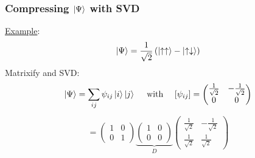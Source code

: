 \documentclass{beamer}
\theoremstyle{definition}
\newcommand{\lp}{\left(}
\newcommand{\rp}{\right)}
\newcommand{\f}[2]{\frac{#1}{#2}}
\begin{document}
\begin{frame}
	\frametitle{Compressing $\ket{\Psi}$ with SVD}
	
	\underline{Example}:  
	\begin{align*}
		\ket{\Psi} = \f{1}{\sqrt{2}}\lp \ket{\uparrow\uparrow} - \ket{\uparrow\downarrow} \rp
	\end{align*}
	\pause 
	Matrixify and SVD:
	\begin{align*}
	\ket{\Psi} = \sum_{ij}\psi_{ij}\ket{i}\ket{j} \quad \text{ with } \quad   [\psi_{ij}] = \begin{pmatrix}
			\f{1}{\sqrt{2}} & -\f{1}{\sqrt{2}} \\ 0 & 0
		\end{pmatrix}
	\end{align*}
\vspace{-10pt}
\pause
\begin{align*}
	[\psi_{ij}] = \begin{pmatrix}
			1 & 0 \\ 0 & 1
		\end{pmatrix}
	\underbrace{\begin{pmatrix}
		1 & 0 \\ 0 & 0 
	\end{pmatrix}}_D
	\begin{pmatrix}
		\f{1}{\sqrt{2}} & -\f{1}{\sqrt{2}} \\ 	\f{1}{\sqrt{2}} & \f{1}{\sqrt{2}}
	\end{pmatrix}
	\end{align*}

\end{frame}
\end{document}
